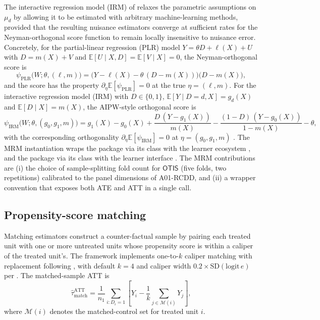 \documentclass[article,shortnames,nojss]{jss}
\newcommand{\OTIS}{\textsf{OTIS}}
\begin{document}
The interactive regression model (IRM) of
\citet{Chernozhukov2018DML} relaxes the parametric assumptions on
$\mu_d$ by allowing it to be estimated with arbitrary
machine-learning methods, provided that the resulting nuisance
estimators converge at sufficient rates for the Neyman-orthogonal
score function to remain locally insensitive to nuisance error.
Concretely, for the partial-linear regression (PLR) model
$Y = \theta D + \ell(X) + U$ with $D = m(X) + V$ and
$\mathbb{E}[U \mid X, D] = \mathbb{E}[V \mid X] = 0$, the
Neyman-orthogonal score is
\begin{equation}\label{eq:plr-score}
\psi_{\mathrm{PLR}}\bigl(W; \theta, (\ell, m)\bigr) =
\bigl(Y - \ell(X) - \theta\,(D - m(X))\bigr)
\bigl(D - m(X)\bigr),
\end{equation}
and the score has the property
$\partial_\eta \mathbb{E}[\psi_{\mathrm{PLR}}] = 0$ at the
true $\eta=(\ell,m)$.  For the interactive regression model
(IRM) with $D \in \{0,1\}$, $\mathbb{E}[Y \mid D=d, X] = g_d(X)$
and $\mathbb{E}[D \mid X] = m(X)$, the AIPW-style orthogonal
score is
\begin{equation}\label{eq:irm-score}
\psi_{\mathrm{IRM}}\bigl(W; \theta, (g_0, g_1, m)\bigr) =
g_1(X) - g_0(X)
+ \frac{D\,(Y - g_1(X))}{m(X)}
- \frac{(1-D)\,(Y - g_0(X))}{1 - m(X)}
- \theta,
\end{equation}
with the corresponding orthogonality
$\partial_\eta \mathbb{E}[\psi_{\mathrm{IRM}}] = 0$ at
$\eta=(g_0, g_1, m)$ \citep{Chernozhukov2018DML}.  The MRM
instantiation wraps the  package
 \citep{Bach2024DoubleML} via its 
class with the  learner ecosystem \citep{Lang2019mlr3},
and the  package  via its
 class with the  learner
interface \citep{Bach2022DoubleMLpy, Pedregosa2011}. The MRM
contributions are (i) the choice of sample-splitting fold count
for $\OTIS$ (five folds, two repetitions) calibrated to the panel
dimensions of A01-RCDD, and (ii) a wrapper convention that exposes
both ATE and ATT in a single call.

\subsection{Propensity-score matching}

Matching estimators construct a counter-factual sample by pairing
each treated unit with one or more untreated units whose propensity
score is within a caliper of the treated unit's. The framework
implements one-to-$k$ caliper matching with replacement following
\citet{Stuart2010}, with default $k=4$ and caliper width $0.2 \times
\mathrm{SD}(\mathrm{logit}\,e)$ per \citet{Austin2011}. The
matched-sample ATT is
\begin{equation}
\hat{\tau}^{\mathrm{ATT}}_{\mathrm{match}} =
\frac{1}{n_1} \sum_{i : D_i = 1} \left[ Y_i - \frac{1}{k} \sum_{j \in \mathcal{M}(i)} Y_j \right],
\end{equation}
where $\mathcal{M}(i)$ denotes the matched-control set for treated
unit $i$.
\end{document}

